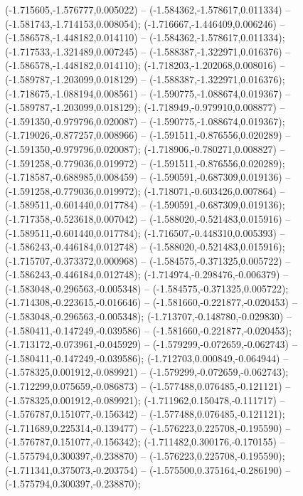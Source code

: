  (-1.715605,-1.576777,0.005022) -- (-1.584362,-1.578617,0.011334) -- (-1.581743,-1.714153,0.008054);
 (-1.716667,-1.446409,0.006246) -- (-1.586578,-1.448182,0.014110) -- (-1.584362,-1.578617,0.011334);
 (-1.717533,-1.321489,0.007245) -- (-1.588387,-1.322971,0.016376) -- (-1.586578,-1.448182,0.014110);
 (-1.718203,-1.202068,0.008016) -- (-1.589787,-1.203099,0.018129) -- (-1.588387,-1.322971,0.016376);
 (-1.718675,-1.088194,0.008561) -- (-1.590775,-1.088674,0.019367) -- (-1.589787,-1.203099,0.018129);
 (-1.718949,-0.979910,0.008877) -- (-1.591350,-0.979796,0.020087) -- (-1.590775,-1.088674,0.019367);
 (-1.719026,-0.877257,0.008966) -- (-1.591511,-0.876556,0.020289) -- (-1.591350,-0.979796,0.020087);
 (-1.718906,-0.780271,0.008827) -- (-1.591258,-0.779036,0.019972) -- (-1.591511,-0.876556,0.020289);
 (-1.718587,-0.688985,0.008459) -- (-1.590591,-0.687309,0.019136) -- (-1.591258,-0.779036,0.019972);
 (-1.718071,-0.603426,0.007864) -- (-1.589511,-0.601440,0.017784) -- (-1.590591,-0.687309,0.019136);
 (-1.717358,-0.523618,0.007042) -- (-1.588020,-0.521483,0.015916) -- (-1.589511,-0.601440,0.017784);
 (-1.716507,-0.448310,0.005393) -- (-1.586243,-0.446184,0.012748) -- (-1.588020,-0.521483,0.015916);
 (-1.715707,-0.373372,0.000968) -- (-1.584575,-0.371325,0.005722) -- (-1.586243,-0.446184,0.012748);
 (-1.714974,-0.298476,-0.006379) -- (-1.583048,-0.296563,-0.005348) -- (-1.584575,-0.371325,0.005722);
 (-1.714308,-0.223615,-0.016646) -- (-1.581660,-0.221877,-0.020453) -- (-1.583048,-0.296563,-0.005348);
 (-1.713707,-0.148780,-0.029830) -- (-1.580411,-0.147249,-0.039586) -- (-1.581660,-0.221877,-0.020453);
 (-1.713172,-0.073961,-0.045929) -- (-1.579299,-0.072659,-0.062743) -- (-1.580411,-0.147249,-0.039586);
 (-1.712703,0.000849,-0.064944) -- (-1.578325,0.001912,-0.089921) -- (-1.579299,-0.072659,-0.062743);
 (-1.712299,0.075659,-0.086873) -- (-1.577488,0.076485,-0.121121) -- (-1.578325,0.001912,-0.089921);
 (-1.711962,0.150478,-0.111717) -- (-1.576787,0.151077,-0.156342) -- (-1.577488,0.076485,-0.121121);
 (-1.711689,0.225314,-0.139477) -- (-1.576223,0.225708,-0.195590) -- (-1.576787,0.151077,-0.156342);
 (-1.711482,0.300176,-0.170155) -- (-1.575794,0.300397,-0.238870) -- (-1.576223,0.225708,-0.195590);
 (-1.711341,0.375073,-0.203754) -- (-1.575500,0.375164,-0.286190) -- (-1.575794,0.300397,-0.238870);
